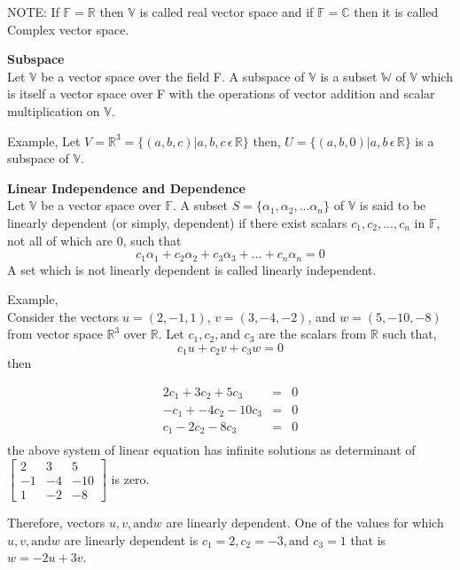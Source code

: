\documentclass[12pt]{report}
\def\F{{\mathbb F}}
\def\R{{\mathbb R}}
\def\C{{\mathbb C}}
\def\W{{\mathbb W}}
\def\V{{ \mathbb V}}
\begin{document}
NOTE: If $\F= \R$ then $\V$ is called real vector space and if $\F=\C$ then it is called Complex vector space.
\begin{defn}
\textbf{Subspace}\\
Let  $\V$ be a vector space over the field F. A subspace of  $\V$ is a subset $\W$ of  $\V$ which is itself a vector space over F with the operations of vector addition and scalar multiplication on  $\V$.
\end{defn}
Example, Let $V = \R^3 = \{(a, b, c) | a, b, c \,\epsilon\, \R\}$ then, $U = \{(a, b, 0) | a, b \,\epsilon\, \R\}$ is a subspace of  $\V$.
\begin{defn}
\textbf{Linear Independence and Dependence}\\
Let  $\V$ be a vector space over  $\F$. A subset $S=\{\alpha_1, \alpha_2, . . . \alpha_n\}$ of $\V$ is said to be linearly dependent (or simply, dependent) if there exist scalars $c_1, c_2, . . . , c_n$ in $\F$, not all of which are $0$, such that
\begin{equation}
c_1\alpha_1+c_2\alpha_2+c_3\alpha_3+...+c_n\alpha_n=0
\end{equation}
A set which is not linearly dependent is called linearly independent. 
\end{defn}
Example, \\Consider the vectors $u=(2,-1,1)$, $v=(3,-4,-2)$, and $w=(5,-10,-8)$ from vector space $\R^3$ over $\R$. 
Let $c_1, c_2,\text{and }c_3 $ are the scalars from $\R$ such that, 
$$ c_1u+c_2v+c_3w=0 $$ 
then 

\begin{displaymath}
\begin{matrix}
2c_1+3c_2+5c_3&=&0\\
-c_1+-4c_2-10c_3&=&0\\
c_1-2c_2-8c_3&=&0\\
\end{matrix}
\end{displaymath}
the above system of linear equation has infinite solutions as determinant of $
\begin{bmatrix} 2&3&5\\-1&-4&-10\\1&-2&-8 \end{bmatrix}$ is zero.

Therefore, vectors $u,v,\text{and} w $ are linearly dependent. 
One of the values for which $u,v,\text{and} w $  are linearly dependent is $c_1=2, c_2=-3,\text{and }c_3=1 $ that is $w=-2u+3v$.
\end{document}
